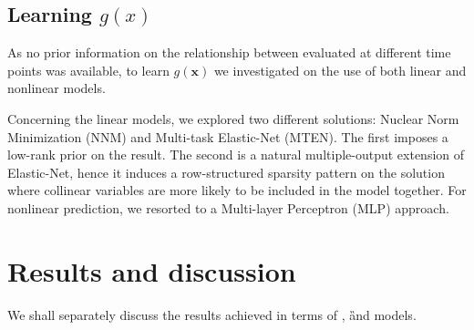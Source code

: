 
\subsection{Learning $g(x)$}

As no prior information on the relationship between \PCOs evaluated at different time points was available, to learn $g(\bm{x})$ we investigated on the use of both linear and nonlinear models.

Concerning the linear models, we explored two different solutions: Nuclear Norm Minimization (\ac{NNM}) and Multi-task Elastic-Net (\ac{MTEN}). The first imposes a low-rank prior on the result. The second is a natural multiple-output extension of Elastic-Net, hence it induces a row-structured sparsity pattern on the solution where collinear variables are more likely to be included in the model together. For nonlinear prediction, we resorted to a Multi-layer Perceptron (\ac{MLP}) approach.

\section{Results and discussion}\label{sec:aism_results}

We shall separately discuss the results achieved in terms of \F, \G and \FOG models.

